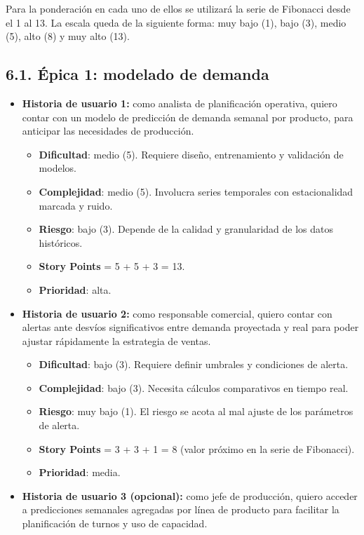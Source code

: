 \documentclass[
11pt, %
]{charter}
\begin{document}
Para la ponderación en cada uno de ellos se utilizará la serie de Fibonacci desde el 1 al 13. La escala queda de la siguiente forma: muy bajo (1), bajo (3), medio (5), alto (8) y muy alto (13).

\subsection*{6.1. Épica 1: modelado de demanda}
\begin{itemize}
  \item \textbf{Historia de usuario 1:} como analista de planificación operativa, quiero contar con un modelo de predicción de demanda semanal por producto, para anticipar las necesidades de producción.
    \begin{itemize}
      \item \textbf{Dificultad}: medio (5). Requiere diseño, entrenamiento y validación de modelos.
      \item \textbf{Complejidad}: medio (5). Involucra series temporales con estacionalidad marcada y ruido.
      \item \textbf{Riesgo}: bajo (3). Depende de la calidad y granularidad de los datos históricos.
      \item \textbf{Story Points} = 5 + 5 + 3 = 13.
      \item \textbf{Prioridad}: alta.
    \end{itemize}
  \item \textbf{Historia de usuario 2:} como responsable comercial, quiero contar con alertas ante desvíos significativos entre demanda proyectada y real para poder ajustar rápidamente la estrategia de ventas.
    \begin{itemize}
      \item \textbf{Dificultad}: bajo (3). Requiere definir umbrales y condiciones de alerta.
      \item \textbf{Complejidad}: bajo (3). Necesita cálculos comparativos en tiempo real.
      \item \textbf{Riesgo}: muy bajo (1). El riesgo se acota al mal ajuste de los parámetros de alerta.
      \item \textbf{Story Points} = 3 + 3 + 1 = 8 (valor próximo en la serie de Fibonacci).
      \item \textbf{Prioridad}: media.
    \end{itemize}
  \item \textbf{Historia de usuario 3 (opcional):} como jefe de producción, quiero acceder a predicciones semanales agregadas por línea de producto para facilitar la planificación de turnos y uso de capacidad.

\end{itemize}
\end{document}
